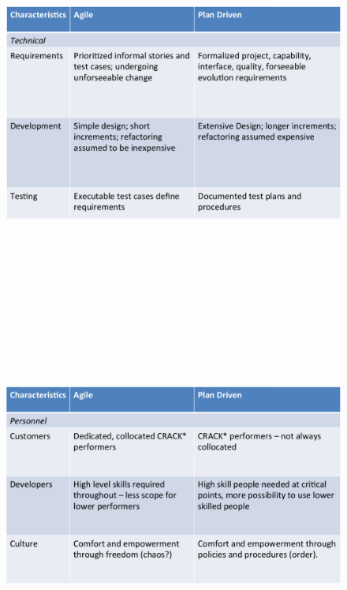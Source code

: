 \documentclass{report}
\begin{document}
\begin{figure}[h]
\begin{center} 
    \includegraphics[scale=0.8,width = 15cm, height = 12cm]{images/AgileTable3.pdf}
\end{center}
\end{figure}

\begin{figure}[h]
\begin{center} 
    \includegraphics[scale=0.8,width = 15cm, height = 12cm]{images/AgileTable4.pdf}
\end{center}
\end{figure}
\end{document}
